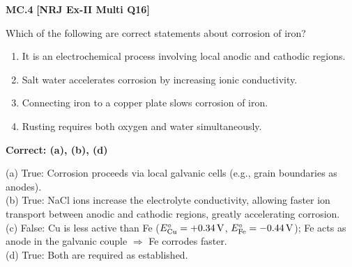\begin{problembox}
\textbf{MC.4} \hfill \textbf{[NRJ Ex-II Multi Q16]}

Which of the following are correct statements about corrosion of iron?
\begin{enumerate}[label=(\alph*)]
    \item It is an electrochemical process involving local anodic and cathodic regions.
    \item Salt water accelerates corrosion by increasing ionic conductivity.
    \item Connecting iron to a copper plate slows corrosion of iron.
    \item Rusting requires both oxygen and water simultaneously.
\end{enumerate}
\end{problembox}
\begin{solution}
\textbf{Correct: (a), (b), (d)}

(a) True: Corrosion proceeds via local galvanic cells (e.g., grain boundaries as anodes). \checkmark\\
(b) True: NaCl ions increase the electrolyte conductivity, allowing faster ion transport between anodic and cathodic regions, greatly accelerating corrosion. \checkmark\\
(c) False: Cu is less active than Fe ($E^\circ_{\ce{Cu}} = +0.34\,\text{V}$, $E^\circ_{\ce{Fe}} = -0.44\,\text{V}$); Fe acts as anode in the galvanic couple $\Rightarrow$ Fe corrodes faster. \texttimes\\
(d) True: Both are required as established. \checkmark
\end{solution}

